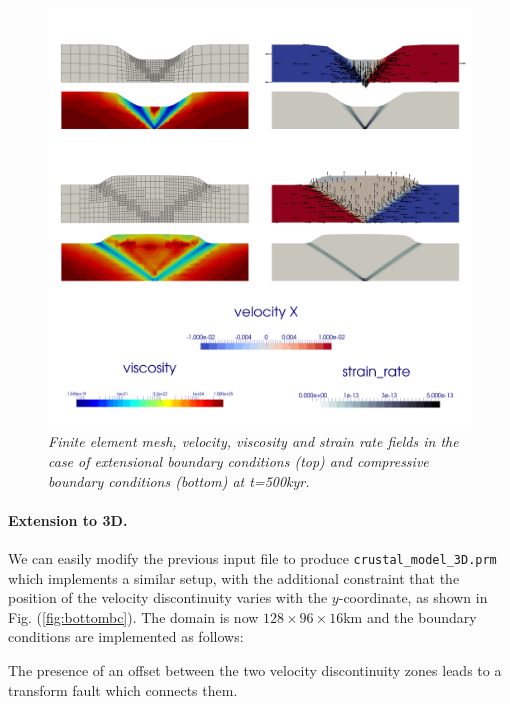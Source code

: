 \documentclass{article}
\begin{document}
\begin{figure}
  \centering
  \includegraphics[width=\textwidth]{cookbooks/crustal_deformation/both.png}
  \caption{\it Finite element mesh, velocity, viscosity and strain rate fields
  in the case of extensional boundary conditions (top) and compressive boundary conditions (bottom) at t=500kyr.}
  \label{fig:extcompr}
\end{figure}



\paragraph{Extension to 3D.} We can easily modify the previous 
input file to produce {\tt crustal\_model\_3D.prm}
which implements a similar setup, with the additional constraint that the position 
of the velocity discontinuity varies with the $y$-coordinate, 
as shown in Fig. (\ref{fig:bottombc}). 
The domain is now 
$128\times96\times16$km and the boundary conditions are implemented as
follows:



The presence of 
an offset between the two velocity discontinuity zones leads to a transform 
fault which connects them. 
\end{document}
